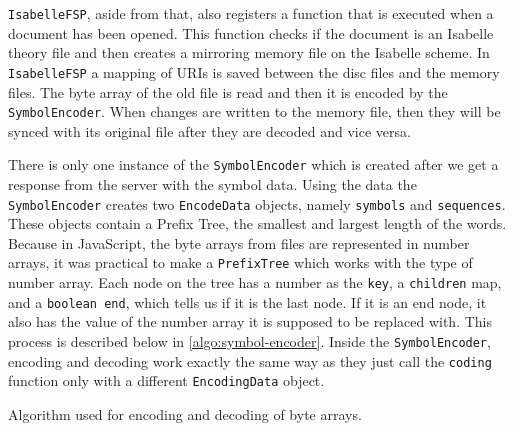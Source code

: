 \texttt{IsabelleFSP}, aside from that, also registers a function that is executed when a document has been opened. This function checks if the document is an Isabelle theory file and then creates a mirroring memory file on the Isabelle scheme. In \texttt{IsabelleFSP} a mapping of URIs is saved between the disc files and the memory files. The byte array of the old file is read and then it is encoded by the \texttt{SymbolEncoder}. When changes are written to the memory file, then they will be synced with its original file after they are decoded and vice versa.

There is only one instance of the \texttt{SymbolEncoder} which is created after we get a response from the server with the symbol data. Using the data the \texttt{SymbolEncoder} creates two \texttt{EncodeData} objects, namely \texttt{symbols} and \texttt{sequences}. These objects contain a Prefix Tree, the smallest and largest length of the words. Because in JavaScript, the byte arrays from files are represented in number arrays, it was practical to make a \texttt{PrefixTree} which works with the type of number array. Each node on the tree has a number as the \texttt{key}, a \texttt{children} map, and a \texttt{boolean end}, which tells us if it is the last node. If it is an end node, it also has the value of the number array it is supposed to be replaced with. This process is described below in \autoref{algo:symbol-encoder}. Inside the \texttt{SymbolEncoder}, encoding and decoding work exactly the same way as they just call the \texttt{coding} function only with a different \texttt{EncodingData} object. 

\begin{algorithm}[H]
\SetAlgoLined
\caption{Algorithm used for encoding and decoding of byte arrays.}
\label{algo:symbol-encoder}
\end{algorithm}

